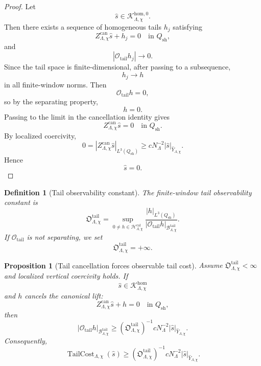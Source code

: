 \documentclass[11pt]{article}
\numberwithin{equation}{section}
\newtheorem{proposition}[theorem]{Proposition}
\newtheorem{definition}[theorem]{Definition}
\begin{document}
\begin{proof}
Let
\[
\widehat s\in \mathcal K_{\Lambda,\chi}^{\mathrm{hom},0}.
\]
Then there exists a sequence of homogeneous tails \(h_j\) satisfying
\[
Z_{\Lambda,\chi}^{\mathrm{can}}\widehat s+h_j=0
\quad
\text{in }Q_{\mathrm{sh}},
\]
and
\[
|\mathcal O_{\mathrm{tail}}h_j|\to0.
\]
Since the tail space is finite-dimensional, after passing to a subsequence,
\[
h_j\to h
\]
in all finite-window norms. Then
\[
\mathcal O_{\mathrm{tail}}h=0,
\]
so by the separating property,
\[
h=0.
\]
Passing to the limit in the cancellation identity gives
\[
Z_{\Lambda,\chi}^{\mathrm{can}}\widehat s=0
\quad
\text{in }Q_{\mathrm{sh}}.
\]
By localized coercivity,
\[
0 =
|Z_{\Lambda,\chi}^{\mathrm{can}}\widehat s|_{L^3(Q_{\mathrm{sh}})}
\ge
cN_\Lambda^{-2}
|\widehat s|_{\widehat Y_{\Lambda,\chi}}.
\]
Hence
\[
\widehat s=0.
\]
\end{proof}

\begin{definition}[Tail observability constant]
The finite-window tail observability constant is
\begin{equation}
\mathfrak O_{\Lambda,\chi}^{\mathrm{tail}} =
\sup_{0\neq h\in\mathcal H_{\Lambda,\chi}^{\mathrm{cal}}}
\frac{
|h|_{L^3(Q_{\mathrm{sh}})}
}{
|\mathcal O_{\mathrm{tail}}h|_{\mathcal B_{\Lambda,\chi}^{\mathrm{tail}}}
}.
\label{eq:tag-10-228}
\end{equation}
If \(\mathcal O_{\mathrm{tail}}\) is not separating, we set
\[
\mathfrak O_{\Lambda,\chi}^{\mathrm{tail}}=+\infty.
\]
\end{definition}

\begin{proposition}[Tail cancellation forces observable tail cost]
Assume \(\mathfrak O_{\Lambda,\chi}^{\mathrm{tail}}<\infty\) and localized vertical coercivity holds. If
\[
\widehat s\in\mathcal K_{\Lambda,\chi}^{\mathrm{hom}}
\]
and \(h\) cancels the canonical lift:
\[
Z_{\Lambda,\chi}^{\mathrm{can}}\widehat s+h=0
\quad
\text{in }Q_{\mathrm{sh}},
\]
then
\begin{equation}
|\mathcal O_{\mathrm{tail}}h|_{\mathcal B_{\Lambda,\chi}^{\mathrm{tail}}}
\ge
\left(\mathfrak O_{\Lambda,\chi}^{\mathrm{tail}}\right)^{-1}
cN_\Lambda^{-2}
|\widehat s|_{\widehat Y_{\Lambda,\chi}}.
\label{eq:tag-10-229}
\end{equation}
Consequently,
\begin{equation}
\operatorname{TailCost}_{\Lambda,\chi}(\widehat s)
\ge
\left(\mathfrak O_{\Lambda,\chi}^{\mathrm{tail}}\right)^{-1}
cN_\Lambda^{-2}
|\widehat s|_{\widehat Y_{\Lambda,\chi}}.
\label{eq:tag-10-230}
\end{equation}

\end{proposition}
\end{document}

